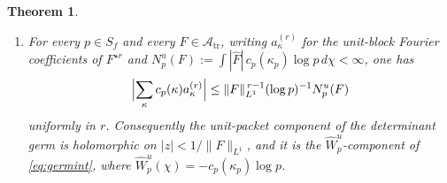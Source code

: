 \documentclass[11pt]{amsart}
\newtheorem{theorem}{Theorem}[section]
\theoremstyle{definition}
\theoremstyle{remark}
\newcommand{\Atr}{\mathcal A_{\mathrm{tr}}}
\begin{document}
\begin{theorem}
\begin{enumerate}
\begin{equation}
\Delta_F(z)\cdot\Delta_G(z)=\Delta_H(z),\qquad
\Delta_{F^{\dagger}}(\bar z)=\overline{\Delta_F(z)} .
\end{equation}
\item[(g)] For every $p\in S_f$ and every $F\in\Atr$, writing
$a^{(r)}_{\kappa}$ for the unit-block Fourier coefficients of $F^{\star r}$ and
$N^{u}_p(F):=\int|\widehat F|\,c_p(\kappa_p)\log p\,d\chi<\infty$, one has
\[
\Bigl|\sum_{\kappa}c_p(\kappa)a^{(r)}_{\kappa}\Bigr|
\le\lVert F\rVert_{L^{1}}^{\,r-1}(\log p)^{-1}N^{u}_p(F)
\]
uniformly in $r$.  Consequently the unit-packet component of the determinant
germ is holomorphic on $|z|<1/\lVert F\rVert_{L^{1}}$, and it is the
$\widehat W^{u}_p$-component of \eqref{eq:germint}, where
$\widehat W^{u}_p(\chi)=-c_p(\kappa_p)\log p$.
\end{enumerate}
\end{theorem}
\end{document}
